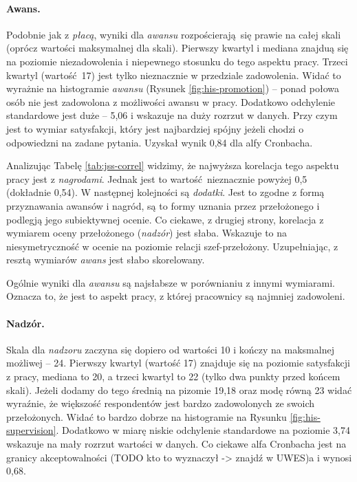 \paragraph{Awans.} Podobnie jak z \textit{płacą}, wyniki dla \emph{awansu} rozpościerają się prawie na całej skali (oprócz wartości maksymalnej dla skali). Pierwszy kwartyl i mediana znajduą się na poziomie niezadowolenia i niepewnego stosunku do tego aspektu pracy. Trzeci kwartyl (wartość 17) jest tylko nieznacznie w przedziale zadowolenia. Widać to wyrażnie na histogramie \emph{awansu} (Rysunek \ref{fig:his-promotion}) -- ponad połowa osób nie jest zadowolona
z możliwości awansu w pracy. Dodatkowo odchylenie standardowe jest duże -- 5,06 i wskazuje na duży rozrzut w danych. Przy czym jest to wymiar satysfakcji, który jest najbardziej spójny jeżeli chodzi o odpowiedzni na zadane pytania. Uzyskał wynik 0,84 dla alfy Cronbacha.

Analizując Tabelę \ref{tab:jss-correl} widzimy, że najwyższa korelacja tego aspektu pracy jest z \textit{nagrodami}. Jednak jest to wartość nieznacznie powyżej 0,5 (dokładnie 0,54). W następnej kolejności są \emph{dodatki}. Jest to zgodne z formą przyznawania awansów i nagród, są to formy uznania przez przełożonego i podlegją jego subiektywnej ocenie. Co ciekawe, z drugiej strony, korelacja z wymiarem oceny przełożonego (\emph{nadzór}) jest słaba. Wskazuje to na niesymetryczność w
ocenie na poziomie relacji szef-przełożony. Uzupełniając, z resztą wymiarów \textit{awans} jest słabo skorelowany. 

Ogólnie wyniki dla \textit{awansu} są najsłabsze w porównianiu z innymi wymiarami. Oznacza to, że jest to aspekt pracy, z której pracownicy są najmniej zadowoleni.

\paragraph{Nadzór.} Skala dla \textit{nadzoru} zaczyna się dopiero od wartości 10 i kończy na maksmalnej możliwej -- 24. Pierwszy kwartyl (wartość 17) znajduje się na poziomie satysfakcji z pracy, mediana to 20, a trzeci kwartyl to 22 (tylko dwa punkty przed końcem skali). Jeżeli dodamy do tego średnią na pizomie 19,18 oraz modę równą 23 widać wyraźnie, że większość respondentów jest bardzo zadowolonych ze swoich przełożonych. Widać to bardzo dobrze na histogramie na Rysunku
\ref{fig:his-supervision}. Dodatkowo w miarę niskie odchylenie standardowe
na poziomie 3,74 wskazuje na mały rozrzut wartości w danych. Co ciekawe alfa Cronbacha jest na granicy akceptowalności (TODO kto to wyznaczył -> znajdź w UWES)a i wynosi 0,68.

